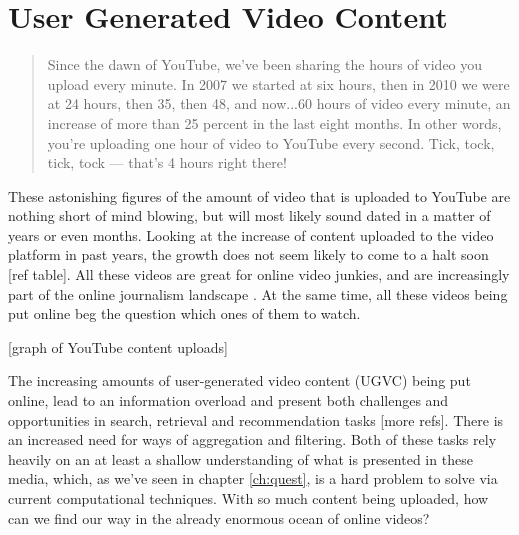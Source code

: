 \section{User Generated Video Content}
\label{sec:weporter_ugvc}

 
% 
% 

\begin{quote}
  Since the dawn of YouTube, we’ve been sharing the hours of video you upload every minute. In 2007 we started at six hours, then in 2010 we were at 24 hours, then 35, then 48, and now...60 hours of video every minute, an increase of more than 25 percent in the last eight months. In other words, you’re uploading one hour of video to YouTube every second. Tick, tock, tick, tock — that’s 4 hours right there!
\end{quote}

These astonishing figures of the amount of video that is uploaded to YouTube are nothing short of mind blowing, but will most likely sound dated in a matter of years or even months. Looking at the increase of content uploaded to the video platform in past years, the growth does not seem likely to come to a halt soon [ref table]. All these videos are great for online video junkies, and are increasingly part of the online journalism landscape \cite{Rosenstiel:2012vb}. At the same time, all these videos being put online beg the question which ones of them to watch.

[graph of YouTube content uploads]

The increasing amounts of user-generated video content (UGVC) being put online, lead to an information overload and present both challenges and opportunities in search, retrieval\cite{Ulges:2009ua} and recommendation\cite{Zhou:2010ut} tasks [more refs]. There is an increased need for ways of aggregation and filtering. Both of these tasks rely heavily on an at least a shallow understanding of what is presented in these media, which, as we've seen in chapter \ref{ch:quest}, is a hard problem to solve via current computational techniques. With so much content being uploaded, how can we find our way in the already enormous ocean of online videos?

